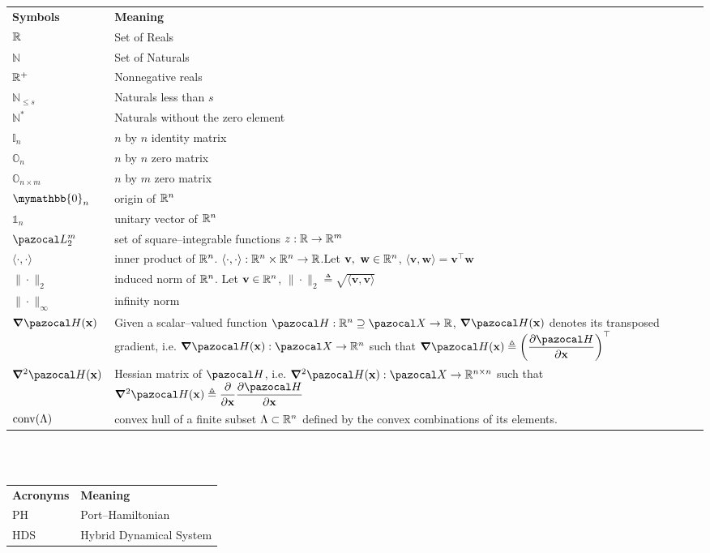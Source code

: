 \mbox{}\\
\mbox{}\\
\begin{tabularx}{0.95\textwidth}{p{2.75cm} X}
\textbf{Symbols} 			& \textbf{Meaning}\\
 $\mathbb{R}$                       & Set of Reals\\
 $\mathbb{N}$               & Set of Naturals\\
 $\mathbb{R}^+$                     & Nonnegative reals\\
 $\mathbb{N}_{\leq s}$      & Naturals less than $s$\\
 $\mathbb{N}^*$             & Naturals without the zero element\\
 $\mathbb{I}_n$             & $n$ by $n$ identity matrix\\
 $\mathbb{O}_n$             & $n$ by $n$ zero matrix\\
 $\mathbb{O}_{n\times m}$   & $n$ by $m$ zero matrix\\
 $\mymathbb{0}_n$           & origin of $\mathbb{R}^n$\\
 $\mathbb{1}_n$             & unitary vector of $\mathbb{R}^n$\\
 $\La_2^m$                  & set of square--integrable functions $z:\mathbb{R}\rightarrow\mathbb{R}^m$\\
 $\langle \cdot,\cdot\rangle$ & {inner product of $\mathbb{R}^n$. $\langle \cdot,\cdot\rangle:\mathbb{R}^n\times\mathbb{R}^n\rightarrow\mathbb{R}$.\newline Let $\mathbf{v},~\mathbf{w}\in\mathbb{R}^n$, $\langle \mathbf{v},\mathbf{w}\rangle = \mathbf{v}^\top \mathbf{w}$} \\
 $\|\cdot\|_2$              & induced norm of $\mathbb{R}^n$. Let $\mathbf{v}\in\mathbb{R}^n$, $\|\cdot\|_2\triangleq\sqrt{\langle \mathbf{v},\mathbf{v}\rangle}$ \\
 $\|\cdot\|_\infty$         & infinity norm\\
 $\bm\nabla\Ha(\xb)$        & Given a scalar--valued function $\Ha:\R^n\supseteq\X\rightarrow\R$, $\bm\nabla\Ha(\xb)$ denotes its transposed gradient, i.e. $\bm\nabla\Ha(\xb):\X\rightarrow\R^n$ such that $\bm\nabla\Ha(\xb)\triangleq\left(\dfrac{\partial \Ha}{\partial\xb}\right)^\top$\\
 $\bm\nabla^2\Ha(\xb)$      & Hessian matrix of $\Ha$, i.e. $\bm\nabla^2\Ha(\xb):\X\rightarrow\R^{n\times n}$ such that $\bm\nabla^2\Ha(\xb)\triangleq\dfrac{\partial}{\partial\xb}\dfrac{\partial\Ha}{\partial\x}$\\
 $\operatorname{conv}(\Lambda)$           & convex hull of a finite subset $\Lambda\subset\mathbb{R}^n$ defined by the convex combinations of its elements. 
\end{tabularx}

\mbox{}\\
\mbox{}\\
\begin{tabularx}{0.95\textwidth}{p{2.75cm} X}
 \textbf{Acronyms} 			& \textbf{Meaning}\\
PH				    & Port--Hamiltonian\\
HDS					& Hybrid Dynamical System\\
\end{tabularx}
